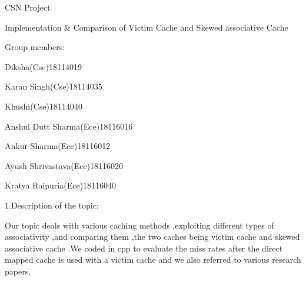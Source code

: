 \documentclass[12pt]{article}
\begin{document}
\begin{Center}
{\fontsize{36pt}{43.2pt}\selectfont CSN Project\par}
\end{Center}\par

\begin{Center}
{\fontsize{26pt}{31.2pt}\selectfont Implementation $\&$  Comparison of Victim Cache and Skewed associative Cache\par}
\end{Center}\par

{\fontsize{22pt}{26.4pt}\selectfont Group members:\par}\par

{\fontsize{16pt}{19.2pt}\selectfont Diksha(Cse)18114019\par}\par

{\fontsize{16pt}{19.2pt}\selectfont Karan Singh(Cse)18114035\par}\par

{\fontsize{16pt}{19.2pt}\selectfont Khushi(Cse)18114040\par}\par

{\fontsize{16pt}{19.2pt}\selectfont Anshul Dutt Sharma(Ece)18116016\par}\par

{\fontsize{16pt}{19.2pt}\selectfont Ankur Sharma(Ece)18116012\par}\par

{\fontsize{16pt}{19.2pt}\selectfont Ayush Shrivastava(Ece)18116020\par}\par

{\fontsize{16pt}{19.2pt}\selectfont Kratya Raipuria(Ece)18116040\par}\par


\vspace{\baselineskip}

\vspace{\baselineskip}
{\fontsize{20pt}{24.0pt}\selectfont 1.Description of the topic:\par}\par

{\fontsize{16pt}{19.2pt}\selectfont  Our topic deals with various caching methods ,exploiting different types of associativity ,and comparing them ,the two caches being victim cache and skewed associative cache .We coded in cpp to evaluate the miss rates after the direct mapped cache is used with a victim cache and we also referred to various research papers.\par}\par
\end{document}
